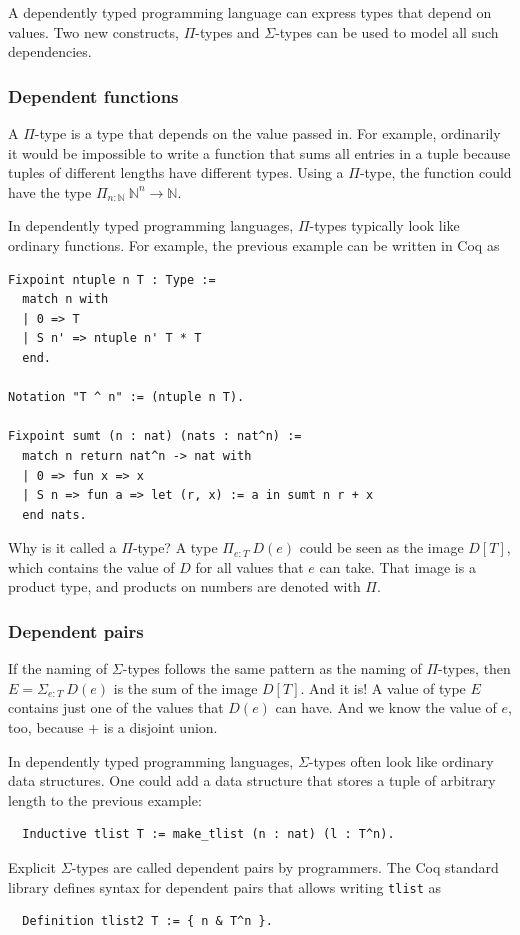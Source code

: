 \documentclass[english, 12pt, a4paper, sci, a-1b, online]{aaltothesis}
\newcommand\icoq[1]{\texttt{#1}}
\begin{document}
A dependently typed programming language can express types that depend on values. Two new constructs, $\Pi$-types and $\Sigma$-types can be used to model all such dependencies.

\subsubsection{Dependent functions}

A $\Pi$-type is a type that depends on the value passed in. For example, ordinarily it would be impossible to write a function that sums all entries in a tuple because tuples of different lengths have different types. Using a $\Pi$-type, the function could have the type $\Pi_{n : \mathbb N}~\mathbb N^n \to \mathbb N$.

In dependently typed programming languages, $\Pi$-types typically look like ordinary functions. For example, the previous example can be written in Coq as
\begin{verbatim}
Fixpoint ntuple n T : Type :=
  match n with
  | 0 => T
  | S n' => ntuple n' T * T
  end.

Notation "T ^ n" := (ntuple n T).

Fixpoint sumt (n : nat) (nats : nat^n) :=
  match n return nat^n -> nat with
  | 0 => fun x => x
  | S n => fun a => let (r, x) := a in sumt n r + x
  end nats.
\end{verbatim}

Why is it called a $\Pi$-type? A type $\Pi_{e:T}~D(e)$ could be seen as the image $D[T]$, which contains the value of $D$ for all values that $e$ can take. That image is a product type, and products on numbers are denoted with $\Pi$.

\subsubsection{Dependent pairs}

If the naming of $\Sigma$-types follows the same pattern as the naming of $\Pi$-types, then $E = \Sigma_{e:T}~D(e)$ is the sum of the image $D[T]$. And it is! A value of type $E$ contains just one of the values that $D(e)$ can have. And we know the value of $e$, too, because $+$ is a disjoint union.

In dependently typed programming languages, $\Sigma$-types often look like ordinary data structures. One could add a data structure that stores a tuple of arbitrary length to the previous example:
\begin{verbatim}
  Inductive tlist T := make_tlist (n : nat) (l : T^n).
\end{verbatim}
Explicit $\Sigma$-types are called dependent pairs by programmers. The Coq standard library defines syntax for dependent pairs that allows writing \icoq{tlist} as
\begin{verbatim}
  Definition tlist2 T := { n & T^n }.
\end{verbatim}
\end{document}
